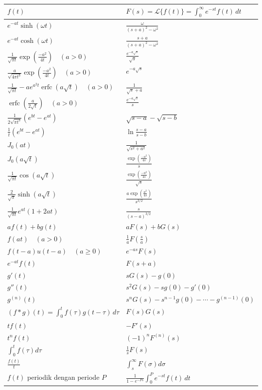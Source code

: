 \begin{center}
\begin{tabular}{@{}ll@{}}
\toprule
$f(t)$ &
$F(s) = \mathcal{L} \bigl\{ f(t) \bigr\}= \int_0^\infty e^{-st} f(t) \, dt$ \\
\midrule
$e^{-at} \sinh(\omega t)$ &
$\frac{\omega}{{(s+a)}^2 - \omega^2}$
\\[6pt]
$e^{-at} \cosh(\omega t)$ &
$\frac{s+a}{{(s+a)}^2 - \omega^2}$
\\[6pt]
$\frac{1}{\sqrt{\pi t}} \exp\left(\frac{-a^2}{4t}\right) \quad (a > 0)$ &
$\frac{e^{-a\sqrt{s}}}{\sqrt{s}}$
\\[6pt]
$\frac{a}{\sqrt{4\pi t^3}} \exp\left(\frac{-a^2}{4t}\right) \quad (a > 0)$ &
$e^{-a \sqrt{s}}$
\\[6pt]
$\frac{1}{\sqrt{\pi t}} - a e^{a^2 t} \operatorname{erfc}(a \sqrt{t}) \quad (a>0)$ &
$\frac{1}{\sqrt{s}+a}$
\\[6pt]
$\operatorname{erfc}\left(\frac{a}{2\sqrt{t}}\right) \quad (a>0)$ &
$\frac{e^{-a\sqrt{s}}}{s}$
\\[6pt]
$\frac{1}{2\sqrt{\pi t^3}}( e^{b t} - e^{a t})$ &
$\sqrt{s-a}-\sqrt{s-b}$
\\[6pt]
$\frac{1}{t} ( e^{b t} - e^{a t})$ &
$\ln \frac{s-a}{s-b}$
\\[6pt]
$J_0(at)$ &
$\frac{1}{\sqrt{s^2+a^2}}$
\\[6pt]
$J_0(a\sqrt{t})$ &
$\frac{\exp\left(\frac{-a^2}{4s}\right)}{s}$
\\[6pt]
$\frac{1}{\sqrt{\pi t}} \cos(a \sqrt{t})$ &
$\frac{\exp\left(\frac{-a^2}{4s}\right)}{\sqrt{s}}$
\\[6pt]
$\frac{2}{\sqrt{\pi}} \sinh(a \sqrt{t})$ &
$\frac{a \exp\left(\frac{a^2}{4s}\right)}{s^{3/2}}$
\\[6pt]
$\frac{1}{\sqrt{\pi t}} e^{at} (1+2at)$ &
$\frac{s}{(s-a)^{3/2}}$
\\[6pt]
$a f(t) + b g(t)$ & $a F(s) + bG(s)$
\\[6pt]
$f(at) \quad (a > 0)$ & $\frac{1}{a}F\left( \frac{s}{a} \right)$
\\[6pt]
$f(t-a)u(t-a) \quad (a \geq 0)$ & $e^{-as} F(s)$
\\[6pt]
$e^{-at} f(t)$ & $F(s+a)$
\\[6pt]
$g'(t)$ & $sG(s)-g(0)$
\\[6pt]
$g''(t)$ & $s^2G(s)-sg(0)-g'(0)$
\\[6pt]
$g^{(n)}(t)$ & $s^nG(s)-s^{n-1}g(0)-\cdots-g^{(n-1)}(0)$
\\[6pt]
$(f * g)(t) = \int_0^t f(\tau) g(t-\tau) \, d\tau$ & $F(s)G(s)$
\\[6pt]
$tf(t)$ & $-F'(s)$
\\[6pt]
$t^nf(t)$ & ${(-1)}^nF^{(n)}(s)$
\\[6pt]
$\int_0^t f(\tau) d\tau$ & $\frac{1}{s} F(s)$
\\[6pt]
$\frac{f(t)}{t}$ & $\int_s^\infty F(\sigma) d\sigma$
\\[6pt]
$f(t)$ periodik dengan periode $P$ &
$\frac{1}{1-e^{-Ps}}
\int_0^P e^{-st} f(t) \, dt$
\\[6pt]
\bottomrule
\end{tabular}
\end{center}
